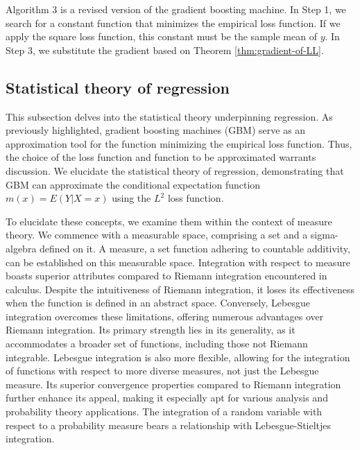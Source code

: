 Algorithm 3 is a revised version of the gradient boosting machine. In Step 1, we search for a constant function that minimizes the empirical loss function. If we apply the square loss function, this constant must be the sample mean of $y$. In Step 3, we substitute the gradient based on Theorem \ref{thm:gradient-of-LL}.


%

\subsection{Statistical theory of regression}
This subsection delves into the statistical theory underpinning regression. As previously highlighted, gradient boosting machines (GBM) serve as an approximation tool for the function minimizing the empirical loss function. Thus, the choice of the loss function and function to be approximated warrants discussion. We elucidate the statistical theory of regression, demonstrating that GBM can approximate the conditional expectation function $m(x) = E(Y|X=x)$ using the $L^2$ loss function.

To elucidate these concepts, we examine them within the context of measure theory. We commence with a measurable space, comprising a set and a sigma-algebra defined on it. A measure, a set function adhering to countable additivity, can be established on this measurable space. Integration with respect to measure boasts superior attributes compared to Riemann integration encountered in calculus. Despite the intuitiveness of Riemann integration, it loses its effectiveness when the function is defined in an abstract space. Conversely, Lebesgue integration overcomes these limitations, offering numerous advantages over Riemann integration. Its primary strength lies in its generality, as it accommodates a broader set of functions, including those not Riemann integrable. Lebesgue integration is also more flexible, allowing for the integration of functions with respect to more diverse measures, not just the Lebesgue measure. Its superior convergence properties compared to Riemann integration further enhance its appeal, making it especially apt for various analysis and probability theory applications. The integration of a random variable with respect to a probability measure bears a relationship with Lebesgue-Stieltjes integration.

